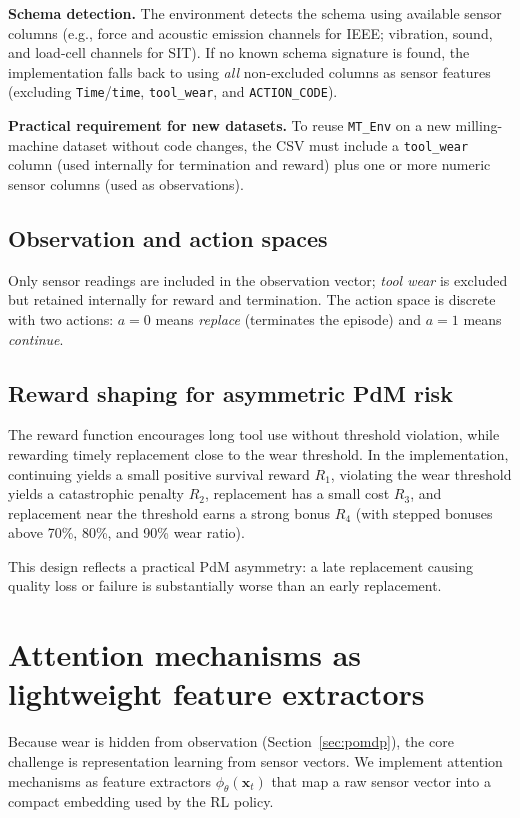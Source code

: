 \documentclass[sn-basic]{sn-jnl} %
\begin{document}
\textbf{Schema detection.}
The environment detects the schema using available sensor columns (e.g., force and acoustic emission channels for IEEE; vibration, sound, and load-cell channels for SIT). If no known schema signature is found, the implementation falls back to using \emph{all} non-excluded columns as sensor features (excluding \texttt{Time}/\texttt{time}, \texttt{tool\_wear}, and \texttt{ACTION\_CODE}).

\textbf{Practical requirement for new datasets.}
To reuse \texttt{MT\_Env} on a new milling-machine dataset without code changes, the CSV must include a \texttt{tool\_wear} column (used internally for termination and reward) plus one or more numeric sensor columns (used as observations).

\subsection{Observation and action spaces}
Only sensor readings are included in the observation vector; \emph{tool wear} is excluded but retained internally for reward and termination. The action space is discrete with two actions: $a=0$ means \emph{replace} (terminates the episode) and $a=1$ means \emph{continue}.

\subsection{Reward shaping for asymmetric PdM risk}
\label{sec:reward}
The reward function encourages long tool use without threshold violation, while rewarding timely replacement close to the wear threshold. In the implementation, continuing yields a small positive survival reward $R_1$, violating the wear threshold yields a catastrophic penalty $R_2$, replacement has a small cost $R_3$, and replacement near the threshold earns a strong bonus $R_4$ (with stepped bonuses above 70\%, 80\%, and 90\% wear ratio).

This design reflects a practical PdM asymmetry: a late replacement causing quality loss or failure is substantially worse than an early replacement.

\section{Attention mechanisms as lightweight feature extractors}
\label{sec:attention}
Because wear is hidden from observation (Section~\ref{sec:pomdp}), the core challenge is representation learning from sensor vectors. We implement attention mechanisms as feature extractors $\phi_\theta(\mathbf{x}_t)$ that map a raw sensor vector into a compact embedding used by the RL policy.
\end{document}
